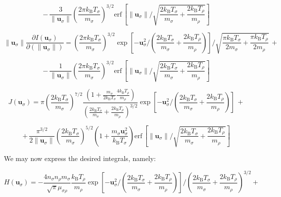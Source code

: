 \begin{equation}
    -\,\frac{3}{\|\mathbf{u}_\sigma\|}\left(\frac{2\pi k_\mathrm{B}T_\sigma}{m_\sigma}\right)^{3/2}\text{erf}\,\left[\|\mathbf{u}_\sigma\|\bigg/\sqrt{\frac{2k_\mathrm{B}T_\sigma}{m_\sigma}+\frac{2k_\mathrm{B}T_\rho}{m_\rho}}\right]
\end{equation}

\begin{equation*}
    \|\mathbf{u}_\sigma\|\frac{\partial I(\mathbf{u}_\sigma)}{\partial(\|\mathbf{u}_\sigma\|)}=\left(\frac{2\pi k_\mathrm{B}T_\sigma}{m_\sigma}\right)^{3/2}\exp{\left[-\mathbf{u}_\sigma^2\bigg/\left(\frac{2k_\mathrm{B}T_\sigma}{m_\sigma}+\frac{2k_\mathrm{B}T_\rho}{m_\rho}\right)\right]}\bigg/\sqrt{\frac{\pi k_\mathrm{B}T_\sigma}{2m_\sigma}+\frac{\pi k_\mathrm{B}T_\rho}{2m_\rho}}\,+
\end{equation*}

\begin{equation}
    -\,\frac{1}{\|\mathbf{u}_\sigma\|}\left(\frac{2\pi k_\mathrm{B}T_\sigma}{m_\sigma}\right)^{3/2}\text{erf}\,{\left[\|\mathbf{u}_\sigma\|\bigg/\sqrt{\frac{2k_\mathrm{B}T_\sigma}{m_\sigma}+\frac{2k_\mathrm{B}T_\rho}{m_\rho}}\right]}
\end{equation}

\begin{equation*}
    J(\mathbf{u}_\sigma)=\pi\left(\frac{2k_\mathrm{B}T_\sigma}{m_\sigma}\right)^{7/2}\frac{\left(1+\frac{m_\sigma}{2k_\mathrm{B}T_\sigma}\frac{4k_\mathrm{B}T_\rho}{m_\rho}\right)}{\left(\frac{2k_\mathrm{B}T_\sigma}{m_\sigma}+\frac{2k_\mathrm{B}T_\rho}{m_\rho}\right)^{3/2}}\exp{\left[-\mathbf{u}_\sigma^2\bigg/\left(\frac{2k_\mathrm{B}T_\sigma}{m_\sigma}+\frac{2k_\mathrm{B}T_\rho}{m_\rho}\right)\right]}\,+
\end{equation*}

\begin{equation}
    +\,\frac{\pi^{3/2}}{2\|\mathbf{u}_\sigma\|}\left(\frac{2k_\mathrm{B}T_\sigma}{m_\sigma}\right)^{5/2}\left(1+\frac{m_\sigma\mathbf{u}_\sigma^2}{k_\mathrm{B}T_\sigma}\right)\text{erf}\,{\left[\|\mathbf{u}_\sigma\|\bigg/\sqrt{\frac{2k_\mathrm{B}T_\sigma}{m_\sigma}+\frac{2k_\mathrm{B}T_\rho}{m_\rho}}\right]}
\end{equation}

We may now express the desired integrals, namely:

\begin{equation*}
    H(\mathbf{u}_\sigma)=-\frac{4n_\sigma n_\rho m_\sigma}{\sqrt{\pi}\mu_{\sigma\rho}}\frac{k_\mathrm{B}T_\rho}{m_\rho}\exp{\left[-\mathbf{u}_\sigma^2\bigg/\left(\frac{2k_\mathrm{B}T_\sigma}{m_\sigma}+\frac{2k_\mathrm{B}T_\rho}{m_\rho}\right)\right]}\bigg/\left(\frac{2k_\mathrm{B}T_\sigma}{m_\sigma}+\frac{2k_\mathrm{B}T_\rho}{m_\rho}\right)^{3/2}+
\end{equation*}

